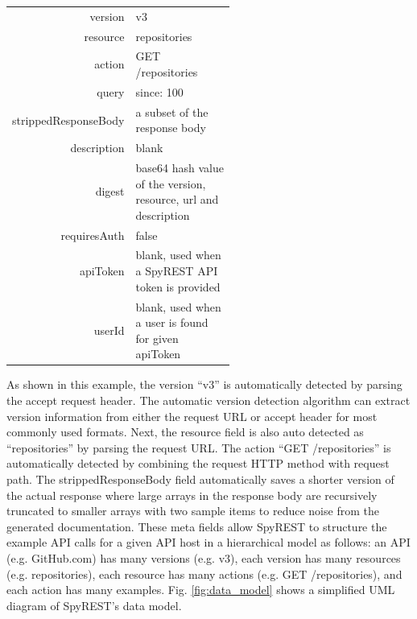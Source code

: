 \documentclass[conference]{IEEEtran}
\begin{document}
\footnotesize
\begin{tabular}{r p{0.55\linewidth}}
  version & v3 \\
  resource & repositories \\
  action & GET /repositories \\
  query & since: 100 \\
  strippedResponseBody & a subset of the response body \\
  description & blank \\
  digest & base64 hash value of the version, resource, url and description \\
  requiresAuth & false \\
  apiToken & blank, used when a SpyREST API token is provided \\
  userId & blank, used when a user is found for given apiToken \\
\end{tabular}
\normalsize


As shown in this example, the version ``v3'' is automatically detected by parsing the accept request header. The automatic version detection algorithm can extract version information from either the request URL or accept header for most commonly used formats. Next, the resource field is also auto detected as ``repositories'' by parsing the request URL. The action ``GET /repositories'' is automatically detected by combining the request HTTP method with request path. The strippedResponseBody field automatically saves a shorter version of the actual response where large arrays in the response body are recursively truncated to smaller arrays with two sample items to reduce noise from the generated documentation. These meta fields allow SpyREST to structure the example API calls for a given API host in a hierarchical model as follows: an API (e.g. GitHub.com) has many versions (e.g. v3), each version has many resources (e.g. repositories), each resource has many actions (e.g. GET /repositories), and each action has many examples. Fig. \ref{fig:data_model} shows a simplified UML diagram of SpyREST's data model.
\end{document}
